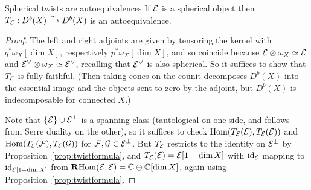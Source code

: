 \begin{proposition}{Spherical twists are autoequivalences}{}
    If $\mathcal{E}$ is a spherical object then
    $T_{\mathcal{E}}:D^b(X)\xrightarrow\sim D^b(X)$ is an autoequivalence.
\end{proposition}

\begin{proof}
    The left and right adjoints are given by tensoring the kernel with
    $q^*\omega_X[\dim X]$, respectively $p^*\omega_X[\dim X]$, and so coincide
    because $\mathcal{E}\otimes\omega_X\simeq\mathcal{E}$ and
    $\mathcal{E}^\vee\otimes\omega_X\simeq\mathcal{E}^\vee$, recalling that $\mathcal{E}^\vee$ is
    also spherical. So it suffices to show that $T_{\mathcal{E}}$ is fully faithful.
    (Then taking cones on the counit decomposes $D^b(X)$ into the essential
    image and the objects sent to zero by the adjoint, but $D^b(X)$ is
    indecomposable for connected $X$.)

    Note that $\{\mathcal{E}\}\cup\mathcal{E}^\perp$ is a spanning class (tautological on
    one side, and follows from Serre duality on the other), so it suffices to
    check $\operatorname{Hom}(T_{\mathcal{E}}(\mathcal{E}),T_{\mathcal{E}}(\mathcal{E}))$ and
    $\operatorname{Hom}(T_{\mathcal{E}}(\mathcal{F}),T_{\mathcal{E}}(\mathcal{G}))$ for $\mathcal{F},\mathcal{G}\in \mathcal{E}^\perp$. But
    $T_{\mathcal{E}}$ restricts to the identity on $\mathcal{E}^\perp$ by
    Proposition~\ref{prop:twistformula}, and $T_{\mathcal{E}}(\mathcal{E})=\mathcal{E}[1-\dim X]$
    with $\mathrm{id}_{\mathcal{E}}$ mapping to $\mathrm{id}_{\mathcal{E}[1-\dim X]}$ from
    $\operatorname{\mathbf{R} Hom}(\mathcal{E},\mathcal{E})=\mathbb{C}\oplus\mathbb{C}[\dim X]$, again using
    Proposition~\ref{prop:twistformula}.
\end{proof}


